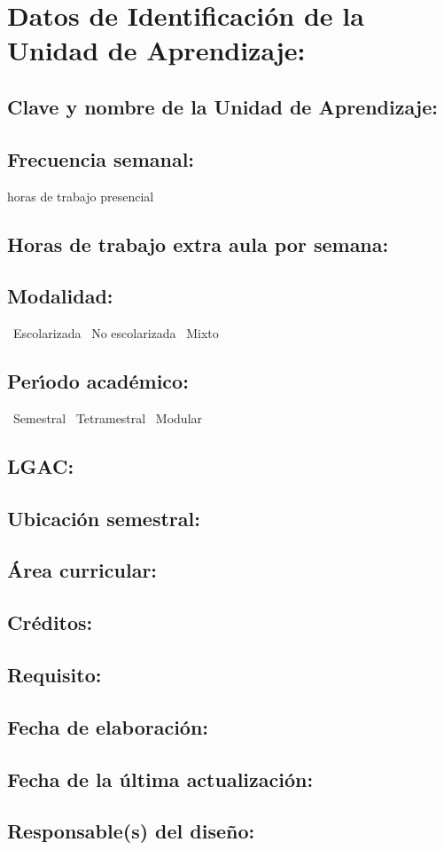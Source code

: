 \documentclass[10 pt]{article}
\begin{document}


\section{Datos de Identificaci\'{o}n de la Unidad de Aprendizaje:}
\subsection{Clave y nombre de la Unidad de Aprendizaje:} 
\subsection{Frecuencia semanal:} horas de trabajo presencial 
\subsection{Horas de trabajo extra aula por semana:} 
\subsection{Modalidad:} \yes~Escolarizada \no~No escolarizada \no~Mixto
\subsection{Per\'{\i}odo acad\'{e}mico:} \yes~Semestral
\no~Tetramestral \no~Modular
\subsection{LGAC:} \underline{\odsi}
\subsection{Ubicaci\'{o}n semestral:} 
\subsection{\'{A}rea curricular:} \underline{\fr}
\subsection{Cr\'{e}ditos:} 
\subsection{Requisito:} 
\subsection{Fecha de elaboraci\'{o}n:} 
\subsection{Fecha de la \'{u}ltima actualizaci\'{o}n:} 
\subsection{Responsable(s) del dise\~{n}o:}
\fbox{\parbox{9cm}{\begin{itemize}[label={}]
\item {\ncesar~\cesar}
\item {\nelisa~\elisa}
\end{itemize}}}
\newpage


\end{document}
